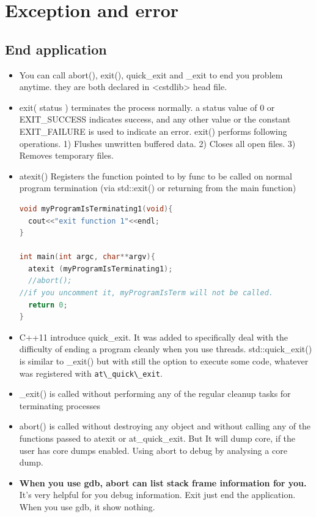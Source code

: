 \documentclass[a4paper,12pt,twoside]{book}
\begin{document}
\chapter{Exception and error}
\section{End application}
\begin{itemize}
\item You can call abort(), exit(), quick\_exit and  \_exit to end you problem anytime. they are both declared in <cstdlib> head file.

\item exit( status ) terminates the process normally.
a status value of 0 or EXIT\_SUCCESS indicates success, and any other value or the constant EXIT\_FAILURE is used to indicate an error. exit() performs following operations. 1) Flushes unwritten buffered data.
2) Closes all open files. 3) Removes temporary files.

\item atexit() Registers the function pointed to by func to be called on normal program termination (via std::exit() or returning from the main function)
\begin{lstlisting}[frame=single, language=c++]
void myProgramIsTerminating1(void){
  cout<<"exit function 1"<<endl;
}

int main(int argc, char**argv){
  atexit (myProgramIsTerminating1);
  //abort();
//if you uncomment it, myProgramIsTerm will not be called.
  return 0;
}
\end{lstlisting}

\item C++11 introduce quick\_exit. It was added to specifically deal with the difficulty of ending a program cleanly when you use threads. std::quick\_exit() is similar to \_exit() but with still the option to execute some code, whatever was registered with \verb=at\_quick\_exit=.

\item \_exit() is called without performing any of the regular cleanup tasks for terminating processes

\item abort() is called without destroying any object and without calling any of the functions passed to atexit or at\_quick\_exit. But It will dump core, if the user has core dumps enabled. Using abort to debug by analysing a core dump.

\item \textbf{When you use gdb, abort can list stack frame information for you.} It's very helpful for you debug information.  Exit just end the application. When you use gdb, it show nothing.



\end{itemize}
\end{document}
